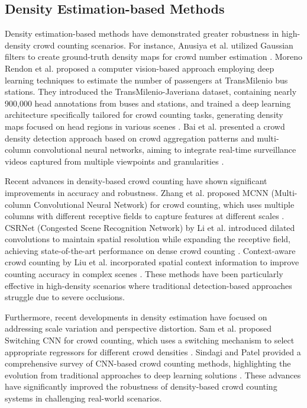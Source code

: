 \subsection{Density Estimation-based Methods}
Density estimation-based methods have demonstrated greater robustness in high-density crowd counting scenarios.
For instance, Anusiya et al. utilized Gaussian filters to create ground-truth density maps for crowd number estimation \cite{71_Density_estimation_method}. Moreno Rendon et al. proposed a computer vision-based approach employing deep learning techniques to estimate the number of passengers at TransMilenio bus stations. They introduced the TransMilenio-Javeriana dataset, containing nearly 900,000 head annotations from buses and stations, and trained a deep learning architecture specifically tailored for crowd counting tasks, generating density maps focused on head regions in various scenes \cite{41_moreno_rendon_passenger_2023}. Bai et al. presented a crowd density detection approach based on crowd aggregation patterns and multi-column convolutional neural networks, aiming to integrate real-time surveillance videos captured from multiple viewpoints and granularities \cite{06_bai_crowd_2021}.

Recent advances in density-based crowd counting have shown significant improvements in accuracy and robustness. Zhang et al. proposed MCNN (Multi-column Convolutional Neural Network) for crowd counting, which uses multiple columns with different receptive fields to capture features at different scales \cite{zhang2016single}. CSRNet (Congested Scene Recognition Network) by Li et al. introduced dilated convolutions to maintain spatial resolution while expanding the receptive field, achieving state-of-the-art performance on dense crowd counting \cite{li2018csrnet}. Context-aware crowd counting by Liu et al. incorporated spatial context information to improve counting accuracy in complex scenes \cite{liu2019context}. These methods have been particularly effective in high-density scenarios where traditional detection-based approaches struggle due to severe occlusions.

Furthermore, recent developments in density estimation have focused on addressing scale variation and perspective distortion. Sam et al. proposed Switching CNN for crowd counting, which uses a switching mechanism to select appropriate regressors for different crowd densities \cite{sam2017switching}. Sindagi and Patel provided a comprehensive survey of CNN-based crowd counting methods, highlighting the evolution from traditional approaches to deep learning solutions \cite{sindagi2017survey}. These advances have significantly improved the robustness of density-based crowd counting systems in challenging real-world scenarios.

